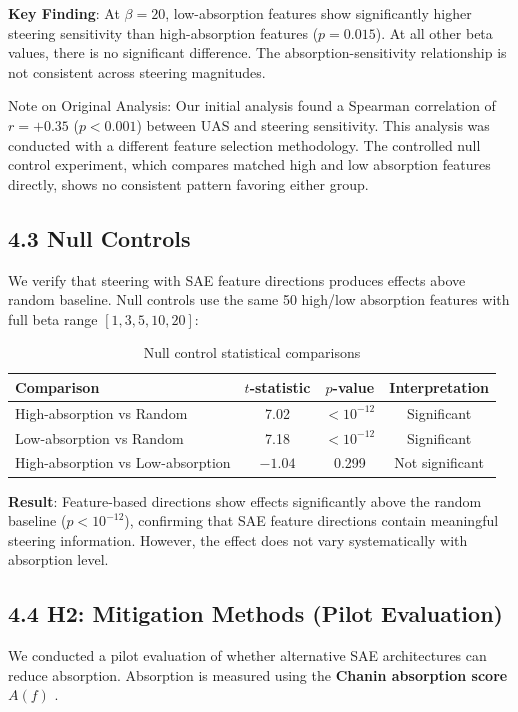 \documentclass{article}
\begin{document}
\textbf{Key Finding}: At $\beta = 20$, low-absorption features show significantly higher steering sensitivity than high-absorption features ($p = 0.015$). At all other beta values, there is no significant difference. The absorption-sensitivity relationship is not consistent across steering magnitudes.

Note on Original Analysis: Our initial analysis found a Spearman correlation of $r = +0.35$ ($p < 0.001$) between UAS and steering sensitivity. This analysis was conducted with a different feature selection methodology. The controlled null control experiment, which compares matched high and low absorption features directly, shows no consistent pattern favoring either group.

\subsection{4.3 Null Controls}

We verify that steering with SAE feature directions produces effects above random baseline. Null controls use the same 50 high/low absorption features with full beta range $[1, 3, 5, 10, 20]$:

\begin{table}[htbp]
\caption{Null control statistical comparisons}
\label{tab:null-controls}
\centering
\begin{tabular}{lccc}
\toprule
Comparison & $t$-statistic & $p$-value & Interpretation \\
\midrule
High-absorption vs Random & 7.02 & $< 10^{-12}$ & Significant \\
Low-absorption vs Random & 7.18 & $< 10^{-12}$ & Significant \\
High-absorption vs Low-absorption & $-1.04$ & 0.299 & Not significant \\
\bottomrule
\end{tabular}
\end{table}

\textbf{Result}: Feature-based directions show effects significantly above the random baseline ($p < 10^{-12}$), confirming that SAE feature directions contain meaningful steering information. However, the effect does not vary systematically with absorption level.

\subsection{4.4 H2: Mitigation Methods (Pilot Evaluation)}

We conducted a pilot evaluation of whether alternative SAE architectures can reduce absorption. Absorption is measured using the \textbf{Chanin absorption score} $A(f)$ \citep{Chanin2024}.
\end{document}
